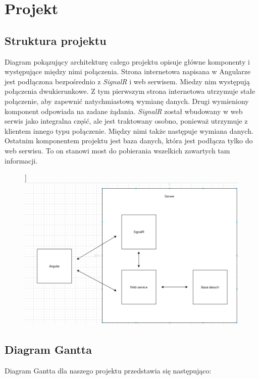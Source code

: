 \documentclass[12pt,a4paper]{article}
\begin{document}
\section{Projekt}

\subsection{Struktura projektu} %

\hspace*{0.7cm} Diagram pokązujący architekturę całego projektu opisuje główne komponenty i występujące między nimi połączenia. Strona internetowa napisana w Angularze jest podłączona bezpośrednio z \textit{SignalR} i web serwisem. Miedzy nim występują połączenia dwukierunkowe. Z tym pierwszym strona internetowa utrzymuje stałe połączenie, aby zapewnić natychmiastową wymianę danych. Drugi wymieniony komponent odpowiada na zadane żądania. \textit{SignalR} został wbudowany w web serwis jako integralna część, ale jest traktowany osobno, ponieważ utrzymuje z klientem innego typu połączenie. Między nimi także następuje wymiana danych. Ostatnim komponentem projektu jest baza danych, która jest podłącza tylko do web serwisu. To on stanowi most do pobierania wszelkich zawartych tam informacji. 

\begin{figure}[H]]
	\centering
	\includegraphics[width=0.7\linewidth]{diagramProjektu}
	\caption{}
	\label{fig:diagramprojektu}
\end{figure}
			
\subsection{Diagram Gantta}				%

\hspace*{0.7cm} Diagram Gantta dla naszego projektu przedstawia się następująco:
\end{document}
